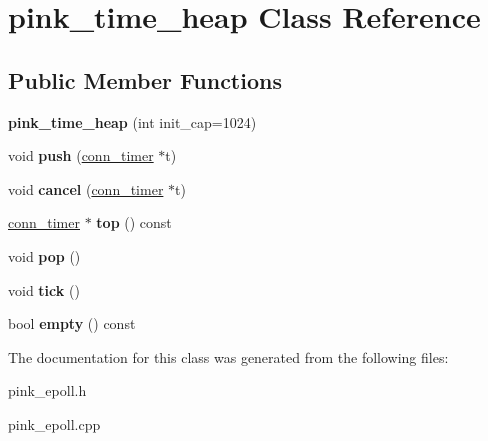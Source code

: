\hypertarget{classpink__time__heap}{}\section{pink\+\_\+time\+\_\+heap Class Reference}
\label{classpink__time__heap}
\subsection*{Public Member Functions}
\begin{DoxyCompactItemize}
\item 
\mbox{\label{classpink__time__heap_a45279534f708648c2f51d166fe0a376a}} 
{\bfseries pink\+\_\+time\+\_\+heap} (int init\+\_\+cap=1024)
\item 
\mbox{\label{classpink__time__heap_aa74cc12fe4a94acbe75b70a3962a862f}} 
void {\bfseries push} (\hyperlink{classconn__timer}{conn\+\_\+timer} $\ast$t)
\item 
\mbox{\label{classpink__time__heap_a331d1f993efc7bd50f8e6d10e5f1c6ee}} 
void {\bfseries cancel} (\hyperlink{classconn__timer}{conn\+\_\+timer} $\ast$t)
\item 
\mbox{\label{classpink__time__heap_ac0932b13390241373290a321ecf16600}} 
\hyperlink{classconn__timer}{conn\+\_\+timer} $\ast$ {\bfseries top} () const
\item 
\mbox{\label{classpink__time__heap_a5642ee3340cdee7983ed63770e7109d1}} 
void {\bfseries pop} ()
\item 
\mbox{\label{classpink__time__heap_a9193dc948c6bb00005bf6639f2169b57}} 
void {\bfseries tick} ()
\item 
\mbox{\label{classpink__time__heap_ade64cf32193747380cb57c5709e28383}} 
bool {\bfseries empty} () const
\end{DoxyCompactItemize}


The documentation for this class was generated from the following files\+:\begin{DoxyCompactItemize}
\item 
pink\+\_\+epoll.\+h\item 
pink\+\_\+epoll.\+cpp\end{DoxyCompactItemize}
